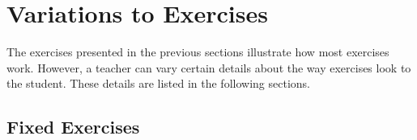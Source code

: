 \documentclass[11pt,oneside,a4paper]{memoir}
\begin{document}

\section{Variations to Exercises}

The exercises presented in the previous sections illustrate how most exercises work. However, a
teacher can vary certain details about the way exercises look to the student. These details are
listed in the following sections.

\subsection{Fixed Exercises}
\end{document}
